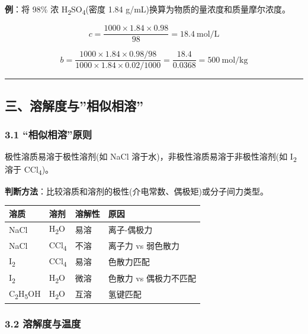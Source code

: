 \documentclass[a4paper,11pt]{ctexart}
\newcounter{none}
\begin{document}
\textbf{例}：将 98\% 浓 H\textsubscript{2}SO\textsubscript{4}(密度 1.84 g/mL)换算为物质的量浓度和质量摩尔浓度。

\[
c = \frac{1000 \times 1.84 \times 0.98}{98} = 18.4\ \mathrm{mol/L}
\]

\[
b = \frac{1000 \times 1.84 \times 0.98 / 98}{1000 \times 1.84 \times 0.02 / 1000} = \frac{18.4}{0.0368} = 500\ \mathrm{mol/kg}
\]

\begin{center}\rule{0.5\linewidth}{0.5pt}\end{center}

\subsection{三、溶解度与''相似相溶''}\label{ux4e09ux6eb6ux89e3ux5ea6ux4e0eux76f8ux4f3cux76f8ux6eb6}

\subsubsection{3.1 ``相似相溶''原则}\label{ux76f8ux4f3cux76f8ux6eb6ux539fux5219}

极性溶质易溶于极性溶剂(如 NaCl 溶于水)，非极性溶质易溶于非极性溶剂(如 I\textsubscript{2} 溶于 CCl\textsubscript{4})。

\textbf{判断方法}：比较溶质和溶剂的极性(介电常数、偶极矩)或分子间力类型。

{\def\LTcaptype{none} %
\begin{longtable}[]{@{}llll@{}}
\toprule\noalign{}
溶质 & 溶剂 & 溶解性 & 原因 \\
\midrule\noalign{}
\endhead
\bottomrule\noalign{}
\endlastfoot
NaCl & H\textsubscript{2}O & 易溶 & 离子-偶极力 \\
NaCl & CCl\textsubscript{4} & 不溶 & 离子力 vs 弱色散力 \\
I\textsubscript{2} & CCl\textsubscript{4} & 易溶 & 色散力匹配 \\
I\textsubscript{2} & H\textsubscript{2}O & 微溶 & 色散力 vs 偶极力不匹配 \\
C\textsubscript{2}H\textsubscript{5}OH & H\textsubscript{2}O & 互溶 & 氢键匹配 \\
\end{longtable}
}

\subsubsection{3.2 溶解度与温度}\label{ux6eb6ux89e3ux5ea6ux4e0eux6e29ux5ea6}
\end{document}
